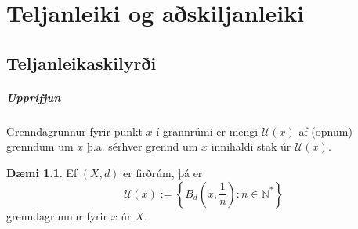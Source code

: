 \documentclass[a4paper,icelandic]{book}
\theoremstyle{definition}
\newtheorem{daemi}{Dæmi}[section]
\theoremstyle{plain}
\theoremstyle{remark}
\newcommand{\N}{\mathbb{N}} %
\begin{document}
\chapter{Teljanleiki og aðskiljanleiki}
\section{Teljanleikaskilyrði}

\paragraph{Upprifjun}
Grenndagrunnur fyrir punkt $x$ í grannrúmi er mengi $\mathcal U(x)$ af
(opnum) grenndum um $x$ þ.a. sérhver grennd um $x$ innihaldi stak úr
$\mathcal U(x)$. 
\begin{daemi}
  Ef $(X,d)$ er firðrúm, þá er \[
  \mathcal U(x) := \left\{ B_d(x,\frac 1n):n\in\N^* \right\}
  \]
  grenndagrunnur fyrir $x$ úr $X$.
\end{daemi}
\end{document}
